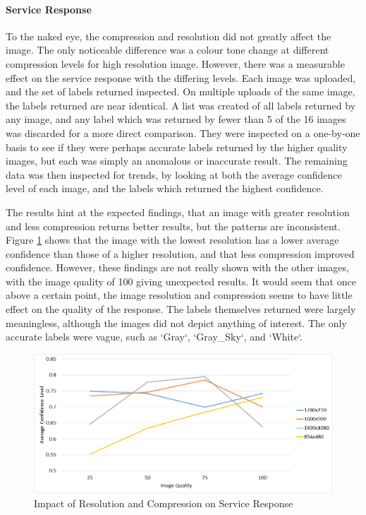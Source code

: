 \documentclass{article}
\begin{document}
\paragraph{Service Response}
To the naked eye, the compression and resolution did not greatly affect the image. The only noticeable difference was a colour tone change at different compression levels for high resolution image. However, there was a measurable effect on the service response with the differing levels. Each image was uploaded, and the set of labels returned inspected. On multiple uploads of the same image, the labels returned are near identical. A list was created of all labels returned by any image, and any label which was returned by fewer than 5 of the 16 images was discarded for a more direct comparison. They were inspected on a one-by-one basis to see if they were perhaps accurate labels returned by the higher quality images, but each was simply an anomalous or inaccurate result. The remaining data was then inspected for trends, by looking at both the average confidence level of each image, and the labels which returned the highest confidence. 

The results hint at the expected findings, that an image with greater resolution and less compression returns better results, but the patterns are inconsistent. Figure \ref{fig:ImageResImpact} shows that the image with the lowest resolution has a lower average confidence than those of a higher resolution, and that less compression improved confidence. However, these findings are not really shown with the other images, with the image quality of 100 giving unexpected results. It would seem that once above a certain point, the image resolution and compression seems to have little effect on the quality of the response. The labels themselves returned were largely meaningless, although the images did not depict anything of interest. The only accurate labels were vague, such as `Gray`, `Gray\_Sky`, and `White`.  

\begin{figure}[h]
\centering
\caption{Impact of Resolution and Compression on Service Response\label{fig:ImageResImpact}}
\includegraphics[width=\textwidth]{ImageResImpact}
\end{figure}
\end{document}
